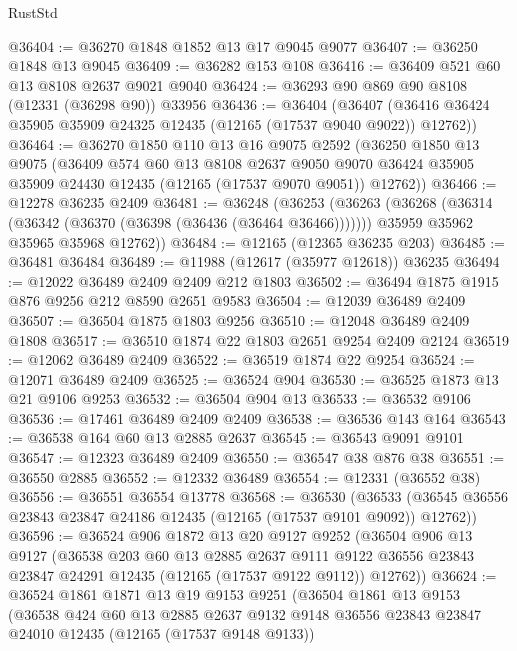 \begin{lexlean}{RustStd}
\begin{coremodule}
@36404 := @36270 @1848 @1852 @13 @17 @9045 @9077
@36407 := @36250 @1848 @13 @9045
@36409 := @36282 @153 @108
@36416 := @36409 @521 @60 @13 @8108 @2637 @9021 @9040
@36424 := @36293 @90 @869 @90 @8108 (@12331 (@36298 @90)) @33956
@36436 := @36404
    (@36407 (@36416 @36424 @35905 @35909 @24325 @12435 (@12165 (@17537 @9040 @9022)) @12762))
@36464 := @36270
    @1850
    @110
    @13
    @16
    @9075
    @2592
    (@36250
      @1850
      @13
      @9075
      (@36409
        @574
        @60
        @13
        @8108
        @2637
        @9050
        @9070
        @36424
        @35905
        @35909
        @24430
        @12435
        (@12165 (@17537 @9070 @9051))
        @12762))
@36466 := @12278 @36235 @2409
@36481 := @36248
    (@36253
      (@36263
        (@36268 (@36314 (@36342 (@36370 (@36398 (@36436 (@36464 @36466)))))))
        @35959
        @35962
        @35965
        @35968
        @12762))
@36484 := @12165 (@12365 @36235 @203)
@36485 := @36481 @36484
@36489 := @11988 (@12617 (@35977 @12618)) @36235
@36494 := @12022 @36489 @2409 @2409 @212 @1803
@36502 := @36494 @1875 @1915 @876 @9256 @212 @8590 @2651 @9583
@36504 := @12039 @36489 @2409
@36507 := @36504 @1875 @1803 @9256
@36510 := @12048 @36489 @2409 @1808
@36517 := @36510 @1874 @22 @1803 @2651 @9254 @2409 @2124
@36519 := @12062 @36489 @2409
@36522 := @36519 @1874 @22 @9254
@36524 := @12071 @36489 @2409
@36525 := @36524 @904
@36530 := @36525 @1873 @13 @21 @9106 @9253
@36532 := @36504 @904 @13
@36533 := @36532 @9106
@36536 := @17461 @36489 @2409 @2409
@36538 := @36536 @143 @164
@36543 := @36538 @164 @60 @13 @2885 @2637
@36545 := @36543 @9091 @9101
@36547 := @12323 @36489 @2409
@36550 := @36547 @38 @876 @38
@36551 := @36550 @2885
@36552 := @12332 @36489
@36554 := @12331 (@36552 @38)
@36556 := @36551 @36554 @13778
@36568 := @36530
    (@36533 (@36545 @36556 @23843 @23847 @24186 @12435 (@12165 (@17537 @9101 @9092)) @12762))
@36596 := @36524
    @906
    @1872
    @13
    @20
    @9127
    @9252
    (@36504
      @906
      @13
      @9127
      (@36538
        @203
        @60
        @13
        @2885
        @2637
        @9111
        @9122
        @36556
        @23843
        @23847
        @24291
        @12435
        (@12165 (@17537 @9122 @9112))
        @12762))
@36624 := @36524
    @1861
    @1871
    @13
    @19
    @9153
    @9251
    (@36504
      @1861
      @13
      @9153
      (@36538
        @424
        @60
        @13
        @2885
        @2637
        @9132
        @9148
        @36556
        @23843
        @23847
        @24010
        @12435
        (@12165 (@17537 @9148 @9133))

\end{coremodule}
\end{lexlean}

